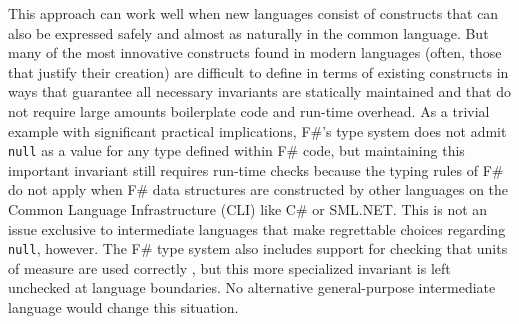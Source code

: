 This approach can work well when new languages consist of constructs that can also be expressed safely and almost as naturally in the common language.
But many of the most innovative constructs found in modern languages (often, those that justify their creation) are difficult to define in terms of existing constructs in ways that guarantee all necessary invariants are statically maintained and that do not require large amounts boilerplate code and run-time overhead. As a trivial example with significant practical implications, F\#'s type system does not admit \verb|null| as a value for any type defined within F\# code, but maintaining this important invariant still requires run-time checks because the typing rules of F\# do not apply when F\# data structures are constructed by other languages on the Common Language Infrastructure (CLI) like C\# or SML.NET. This is not an issue exclusive to intermediate languages that make regrettable choices regarding \verb|null|, however. The F\# type system also includes support for checking that units of measure are used correctly \cite{syme2012expert, kennedy1994dimension}, but this more specialized invariant is left unchecked at language boundaries. No alternative  general-purpose intermediate language would change this situation. %

